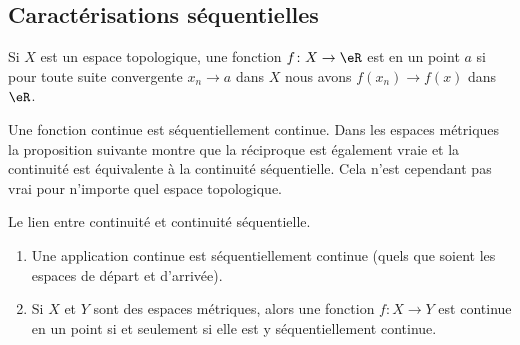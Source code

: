 \subsection{Caractérisations séquentielles}

\begin{definition}  \label{DefENioICV}
    Si \( X\) est un espace topologique, une fonction \( f\colon X\to \eR\) est  en un point \( a\) si pour toute suite convergente \( x_n\to a\) dans \( X\) nous avons \( f(x_n)\to f(x)\) dans \( \eR\).
\end{definition}


Une fonction continue est séquentiellement continue. Dans les espaces métriques la proposition suivante montre que la réciproque est également vraie et la continuité est équivalente à la continuité séquentielle. Cela n'est cependant pas vrai pour n'importe quel espace topologique.

\begin{proposition}		\label{PropFnContParSuite}
    Le lien entre continuité et continuité séquentielle.

    \begin{enumerate}
        \item
    Une application continue est séquentiellement continue (quels que soient les espaces de départ et d'arrivée).

\item

    Si \( X\) et \( Y\) sont des espaces métriques, alors une fonction \( f\colon X\to Y\) est continue en un point si et seulement si elle est y séquentiellement continue.
    \end{enumerate}
\end{proposition}

